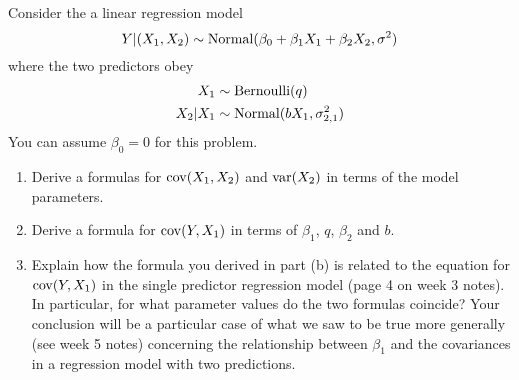 \begin{exercise}\label{ex:binnorm}
Consider the a linear regression model 
\begin{equation*}
Y|(X_1,X_2) \sim {\rm Normal}(\beta_0 + \beta_1X_1 + \beta_2X_2,\sigma^2)
\end{equation*}
 where the two predictors obey
\begin{align*}
X_1 &\sim {\rm Bernoulli}(q)\\
X_2|X_1 &\sim {\rm Normal}(bX_1,\sigma_{2,1}^2)
\end{align*}
You can assume $\beta_0 =0$ for this problem. 
\begin{enumerate}[label=(\alph*)]
\item Derive a formulas for ${\rm cov}(X_1,X_2)$ and ${\rm var}(X_2)$ in terms of the model parameters. 
\item Derive a formula for ${\rm cov}(Y,X_1)$ in terms of $\beta_1$, $q$, $\beta_2$ and $b$.  
\item Explain how the formula you derived in part (b) is related to the equation for ${\rm cov}(Y,X_1)$ in the single predictor regression model (page 4 on week 3 notes). In particular, for what parameter values do the two formulas coincide? Your conclusion will be a particular case of what we saw to be true more generally (see week 5 notes) concerning the relationship between $\beta_1$ and the covariances in a regression model with two predictions. 

\end{enumerate}
\end{exercise}
